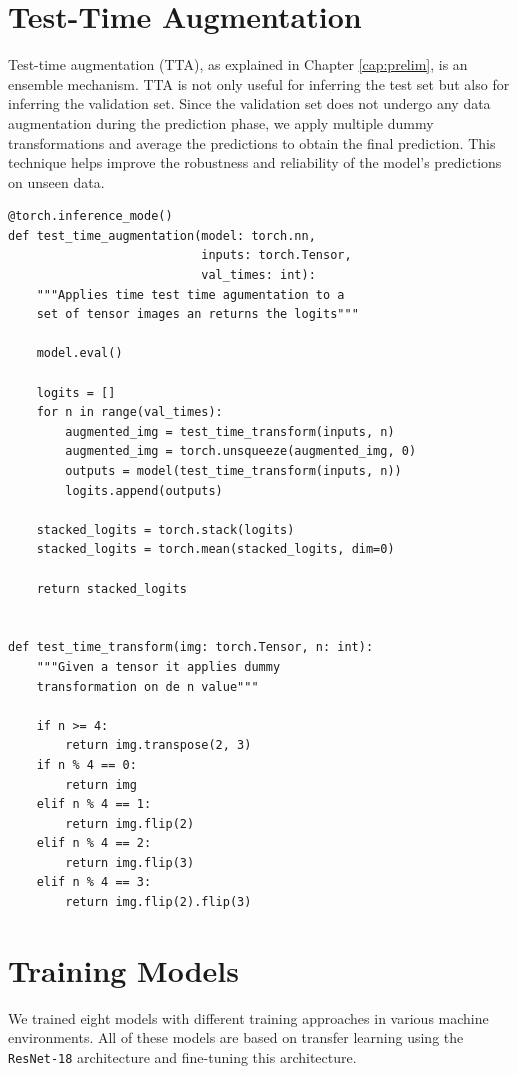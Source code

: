 \section{Test-Time Augmentation}

Test-time augmentation (TTA), as explained in Chapter \ref{cap:prelim}, is an ensemble mechanism. TTA is not only useful for inferring the test set but also for inferring the validation set. Since the validation set does not undergo any data augmentation during the prediction phase, we apply multiple dummy transformations and average the predictions to obtain the final prediction. This technique helps improve the robustness and reliability of the model's predictions on unseen data.

\begin{Verbatim}[fontsize=\scriptsize]
@torch.inference_mode()
def test_time_augmentation(model: torch.nn,
                           inputs: torch.Tensor,
                           val_times: int):
    """Applies time test time agumentation to a
    set of tensor images an returns the logits"""

    model.eval()

    logits = []
    for n in range(val_times):
        augmented_img = test_time_transform(inputs, n)
        augmented_img = torch.unsqueeze(augmented_img, 0)
        outputs = model(test_time_transform(inputs, n))
        logits.append(outputs)

    stacked_logits = torch.stack(logits)
    stacked_logits = torch.mean(stacked_logits, dim=0)

    return stacked_logits


def test_time_transform(img: torch.Tensor, n: int):
    """Given a tensor it applies dummy
    transformation on de n value"""

    if n >= 4:
        return img.transpose(2, 3)
    if n % 4 == 0:
        return img
    elif n % 4 == 1:
        return img.flip(2)
    elif n % 4 == 2:
        return img.flip(3)
    elif n % 4 == 3:
        return img.flip(2).flip(3)
\end{Verbatim}

\section{Training Models}

We trained eight models with different training approaches in various machine environments. All of these models are based on transfer learning using the \texttt{ResNet-18} architecture and fine-tuning this architecture. \\

